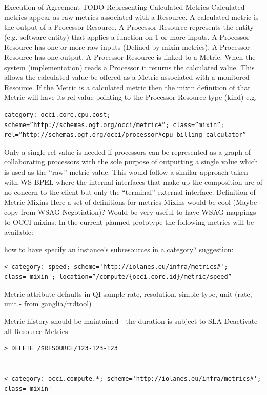 \documentclass[12pt]{article}  %
\begin{document}
{
\color{green}
Execution of Agreement
TODO
Representing Calculated Metrics
Calculated metrics appear as raw metrics associated with a Resource. A calculated metric is the output of a Processor Resource. A Processor Resource represents the entity (e.g. software entity) that applies a function on 1 or more inputs. A Processor Resource has one or more raw inputs (Defined by mixin metrics). A Processor Resource has one output. A Processor Resource is linked to a Metric. When the system (implementation) reads a Processor it returns the calculated value. This allows the calculated value be offered as a Metric associated with a monitored Resource. If the Metric is a calculated metric then the mixin definition of that Metric will have its rel value pointing to the Processor Resource type (kind) e.g.

\begin{verbatim}
category: occi.core.cpu.cost; scheme=”http://schemas.ogf.org/occi/metric#”; class=”mixin”; rel=”http://schemas.ogf.org/occi/processor#cpu_billing_calculator”
\end{verbatim}

Only a single rel value is needed if processors can be represented as a graph of collaborating processors with the sole purpose of outputting a single value which is used as the “raw” metric value. This would follow a similar approach taken with WS-BPEL where the internal interfaces that make up the composition are of no concern to the client but only the “terminal” external interface.
Definition of Metric Mixins
Here a set of definitions for metrics Mixins would be cool (Maybe copy from WSAG-Negotiation)? Would be very useful to have WSAG mappings to OCCI mixins. In the current planned prototype the following metrics will be available:


how to have specify an instance’s subresources in a category?
suggestion:
\begin{verbatim}
< category: speed; scheme='http://iolanes.eu/infra/metrics#'; class='mixin'; location=”/compute/{occi.core.id}/metric/speed”
\end{verbatim}

Metric attribute defaults in QI
sample rate, resolution, simple type, unit (rate, unit - from ganglia/rrdtool)


Metric history should be maintained - the duration is subject to SLA
Deactivate all Resource Metrics
\begin{verbatim}
> DELETE /$RESOURCE/123-123-123


< category: occi.compute.*; scheme='http://iolanes.eu/infra/metrics#'; class='mixin'
\end{verbatim}


}
\end{document}

